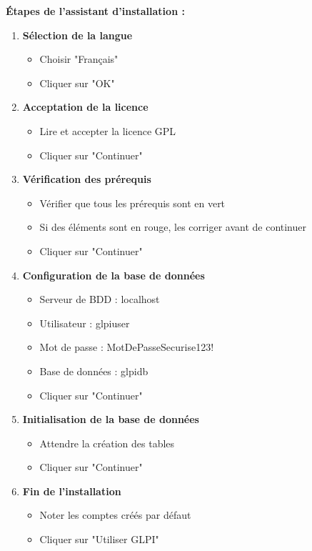 \documentclass[12pt,a4paper]{article}
\begin{document}
\textbf{Étapes de l'assistant d'installation :}
\begin{enumerate}
    \item \textbf{Sélection de la langue}
    \begin{itemize}
        \item Choisir "Français"
        \item Cliquer sur "OK"
    \end{itemize}
    
    \item \textbf{Acceptation de la licence}
    \begin{itemize}
        \item Lire et accepter la licence GPL
        \item Cliquer sur "Continuer"
    \end{itemize}
    
    \item \textbf{Vérification des prérequis}
    \begin{itemize}
        \item Vérifier que tous les prérequis sont en vert
        \item Si des éléments sont en rouge, les corriger avant de continuer
        \item Cliquer sur "Continuer"
    \end{itemize}
    
    \item \textbf{Configuration de la base de données}
    \begin{itemize}
        \item Serveur de BDD : localhost
        \item Utilisateur : glpiuser
        \item Mot de passe : MotDePasseSecurise123!
        \item Base de données : glpidb
        \item Cliquer sur "Continuer"
    \end{itemize}
    
    \item \textbf{Initialisation de la base de données}
    \begin{itemize}
        \item Attendre la création des tables
        \item Cliquer sur "Continuer"
    \end{itemize}
    
    \item \textbf{Fin de l'installation}
    \begin{itemize}
        \item Noter les comptes créés par défaut
        \item Cliquer sur "Utiliser GLPI"
    \end{itemize}
\end{enumerate}
\end{document}
